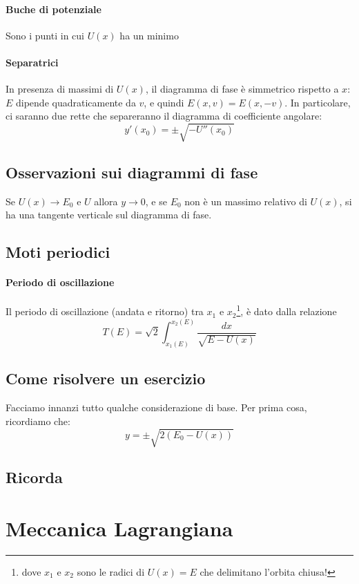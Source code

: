 \documentclass[a4paper,12pt]{article}
\begin{document}
\paragraph{Buche di potenziale}
Sono i punti in cui $U(x)$ ha un minimo
\paragraph{Separatrici}
In presenza di massimi di $U(x)$, il diagramma di fase è simmetrico rispetto a $x$: $E$ dipende quadraticamente da $v$, e quindi $E(x, v) = E(x, -v)$.
In particolare, ci saranno due rette che separeranno il diagramma di coefficiente angolare:
$$y'(x_0) = \pm\sqrt{-U''(x_0)}$$

\subsection{Osservazioni sui diagrammi di fase}
Se $U(x) \to E_0$ e $U$ allora $y \to 0$, e se $E_0$ non è un massimo relativo di $U(x)$, si ha una tangente verticale sul diagramma di fase.


\subsection{Moti periodici}
\paragraph{Periodo di oscillazione}
Il periodo di oscillazione (andata e ritorno) tra $x_1$ e $x_2$\footnote{dove $x_1$ e $x_2$ sono le radici di $U(x) = E $ che delimitano l'orbita chiusa! }, è dato dalla relazione
$$ T(E) = \sqrt{2}\int_{x_1(E)}^{x_2(E)} \dfrac{dx}{\sqrt{E-U(x)}}$$

\subsection{Come risolvere un esercizio}
Facciamo innanzi tutto qualche considerazione di base. Per prima cosa, ricordiamo che:
$$y = \pm \sqrt{2(E_0-U(x))}$$




\subsection{Ricorda}


\section{Meccanica Lagrangiana}
\end{document}
